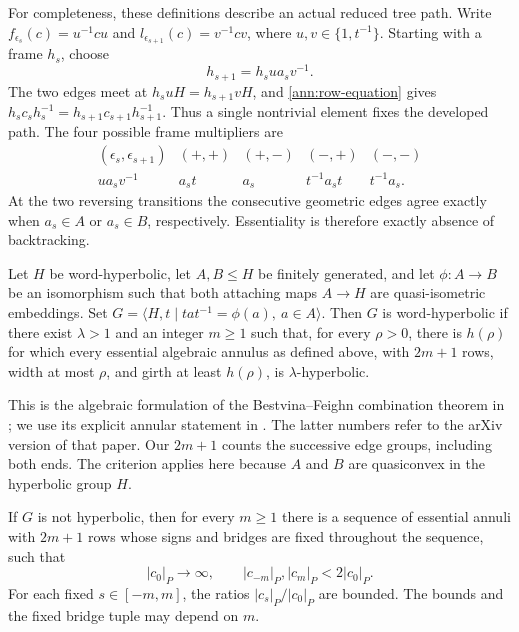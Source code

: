 For completeness, these definitions describe an actual reduced tree
path.  Write $f_{\epsilon_s}(c)=u^{-1}cu$ and
$l_{\epsilon_{s+1}}(c)=v^{-1}cv$, where $u,v\in\{1,t^{-1}\}$.
Starting with a frame $h_s$, choose
\begin{equation}
 h_{s+1}=h_su a_sv^{-1}.
 \label{ann:frame-equation}
\end{equation}
The two edges meet at $h_suH=h_{s+1}vH$, and
\eqref{ann:row-equation} gives
$h_sc_sh_s^{-1}=h_{s+1}c_{s+1}h_{s+1}^{-1}$.  Thus a single nontrivial
element fixes the developed path.  The four possible frame multipliers
are
\[
\begin{array}{c|cccc}
 (\epsilon_s,\epsilon_{s+1})&(+,+)&(+,-)&(-,+)&(-,-)\\ \hline
 u a_sv^{-1}&a_st&a_s&t^{-1}a_st&t^{-1}a_s.
\end{array}
\]
At the two reversing transitions the consecutive geometric edges agree
exactly when $a_s\in A$ or $a_s\in B$, respectively.  Essentiality is
therefore exactly absence of backtracking.

\begin{theorem}
\label{ann:external-flaring}
Let $H$ be word-hyperbolic, let $A,B\leq H$ be finitely generated,
and let $\phi:A\to B$ be an isomorphism such that both attaching
maps $A\to H$ are quasi-isometric embeddings. Set
$G=\langle H,t\mid tat^{-1}=\phi(a),\ a\in A\rangle$.
Then $G$ is word-hyperbolic if there exist $\lambda>1$ and an integer
$m\geq1$ such that, for every $\rho>0$, there is $h(\rho)$ for which
every essential algebraic annulus as defined above, with $2m+1$ rows,
width at most $\rho$, and girth at least $h(\rho)$, is
$\lambda$-hyperbolic.
\end{theorem}

This is the algebraic formulation of the Bestvina--Feighn combination
theorem in \cite[Theorem~1.2]{BestvinaFeighn1996Addendum}; we use its explicit
annular statement in \cite[Definitions~4.1--4.4 and Theorem~4.5]{Kapovich1999NonQuasiconvexity}.
The latter numbers refer to the arXiv version of that paper.  Our
$2m+1$ counts the successive edge groups, including both ends.  The
criterion applies here because $A$ and $B$ are quasiconvex in the
hyperbolic group $H$.

\begin{lemma}
\label{ann:counterannuli}
If $G$ is not hyperbolic, then for every $m\geq1$ there is a sequence
of essential annuli with $2m+1$ rows whose signs and bridges are fixed
throughout the sequence, such that
\[
 |c_0|_P\longrightarrow\infty,
 \qquad |c_{-m}|_P,|c_m|_P<2|c_0|_P.
\]
For each fixed $s\in[-m,m]$, the ratios $|c_s|_P/|c_0|_P$ are bounded.
The bounds and the fixed bridge tuple may depend on $m$.
\end{lemma}

